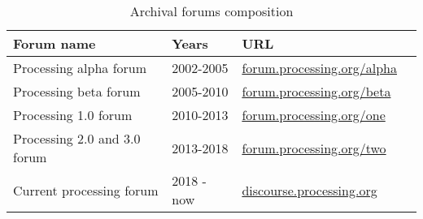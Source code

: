\begin{table}[h]
	\raggedright
	\begin{adjustbox}{center}
		\begin{tabular}{l l l c}
			\toprule
			Forum name                   & Years      & URL                                                                    \\
			\midrule
			Processing alpha forum       & 2002-2005  & \href{https://forum.processing.org/alpha/}{forum.processing.org/alpha} \\
			Processing beta forum        & 2005-2010  & \href{https://forum.processing.org/beta/}{forum.processing.org/beta}   \\
			Processing 1.0 forum         & 2010-2013  & \href{https://forum.processing.org/one/}{forum.processing.org/one}     \\
			Processing 2.0 and 3.0 forum & 2013-2018  & \href{https://forum.processing.org/two/}{forum.processing.org/two}     \\
			Current processing forum     & 2018 - now & \href{https://discourse.processing.org/}{discourse.processing.org}     \\
			\bottomrule
		\end{tabular}
	\end{adjustbox}
	\caption{Archival forums composition}
	\label{table:forums}
\end{table}